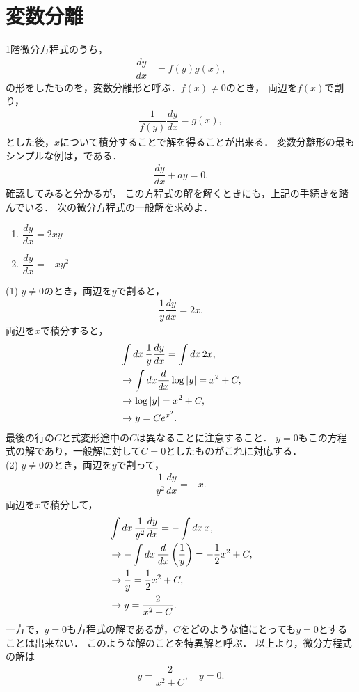 \section{変数分離}
%
1階微分方程式のうち，
\begin{align}
  \dfrac{dy}{dx} & =f\left(y\right)g\left(x\right),
\end{align}
の形をしたものを，変数分離形と呼ぶ．$f\left(x\right) \neq 0$のとき，
両辺を$f\left(x\right)$で割り，
\begin{align}
  \dfrac{1}{f\left(y\right)}\dfrac{dy}{dx} = g\left(x\right),
\end{align}
とした後，$x$について積分することで解を得ることが出来る．
変数分離形の最もシンプルな例は，である．
\begin{align}
 \dfrac{dy}{dx} + ay = 0. 
\end{align}
確認してみると分かるが，
この方程式の解を解くときにも，上記の手続きを踏んでいる．
%
\newpage
%
\gl
\reidai
次の微分方程式の一般解を求めよ．
\begin{enumerate}[(1)]
  \item  $\dfrac{dy}{dx} = 2xy$
  \item  $\dfrac{dy}{dx} = -xy^2$
\end{enumerate}
\gl
\noindent
(1) $y\neq 0$のとき，両辺を$y$で割ると，
\begin{align}
  \dfrac{1}{y}\dfrac{dy}{dx} = 2x. 
\end{align} 
両辺を$x$で積分すると，
\begin{align}
  & \int dx\, \dfrac{1}{y}\dfrac{dy}{dx} = \int dx\,2x, \notag \\
  & \rightarrow \int dx \dfrac{d}{dx} \log \left|y\right| = x^2 + C, \notag \\
  & \rightarrow \log \left|y\right| = x^2 + C, \notag \\
  & \rightarrow y = Ce^{x^2}. 
\end{align}
最後の行の$C$と式変形途中の$C$は異なることに注意すること．
$y=0$もこの方程式の解であり，一般解に対して$C=0$としたものがこれに対応する．\\
(2) $y\neq 0$のとき，両辺を$y$で割って，
\begin{align}
  \dfrac{1}{y^2}\dfrac{dy}{dx} = - x. 
\end{align}
両辺を$x$で積分して，
\begin{align}
  & \int dx\, \dfrac{1}{y^2}\dfrac{dy}{dx} = -\int dx\,x, \notag \\
  & \rightarrow -\int dx\, \dfrac{d}{dx}\left(\dfrac{1}{y}\right) = -\dfrac{1}{2}x^2 + C, \notag \\
  & \rightarrow \dfrac{1}{y} = \dfrac{1}{2} x^2 +C, \notag \\
  & \rightarrow y = \dfrac{2}{x^2 + C}. 
\end{align}
一方で，$y=0$も方程式の解であるが，$C$をどのような値にとっても$y=0$とすることは出来ない．
このような解のことを特異解と呼ぶ．
以上より，微分方程式の解は
\begin{align}
  y = \dfrac{2}{x^2 + C}, \quad y = 0. 
\end{align}

